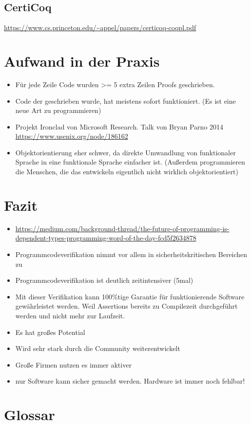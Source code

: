 \subsection{CertiCoq}
\url{https://www.cs.princeton.edu/~appel/papers/certicoq-coqpl.pdf}

\section{Aufwand in der Praxis}
\begin{itemize}
	\item Für jede Zeile Code wurden >= 5 extra Zeilen Proofs geschrieben.
	\item Code der geschrieben wurde, hat meistens sofort funktioniert. (Es ist eine neue Art zu programmieren)
	\item Projekt Ironclad von Microsoft Research. Talk von Bryan Parno 2014 \url{https://www.usenix.org/node/186162}
	\item Objektorientierung eher schwer, da direkte Umwandlung von funktionaler Sprache in eine funktionale Sprache einfacher ist. (Außerdem programmieren die Menschen, die das entwickeln eigentlich nicht wirklich objektorientiert)
\end{itemize}


\section{Fazit}
\begin{itemize}
	\item \url{https://medium.com/background-thread/the-future-of-programming-is-dependent-types-programming-word-of-the-day-fcd5f2634878}
	\item Programmcodeverifikation nimmt vor allem in sicherheitskritischen Bereichen zu
	\item Programmcodeverifikation ist deutlich zeitintensiver (5mal)
	\item Mit dieser Verifikation kann 100\%tige Garantie für funktionierende Software gewährleistet werden. Weil Assertions bereits zu Compilezeit durchgeführt werden und nicht mehr zur Laufzeit.
	\item Es hat großes Potential
	\item Wird sehr stark durch die Community weiterentwickelt
	\item Große Firmen nutzen es immer aktiver
	\item nur Software kann sicher gemacht werden. Hardware ist immer noch fehlbar!
\end{itemize}

\section{Glossar}


